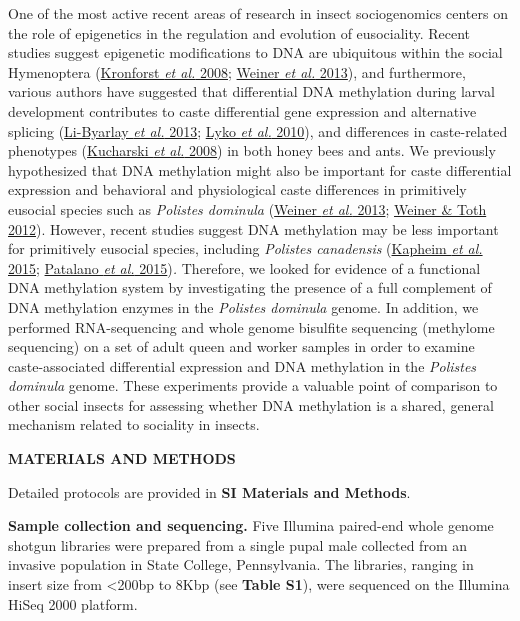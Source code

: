 \documentclass[]{article}
\begin{document}
One of the most active recent areas of research in insect sociogenomics
centers on the role of epigenetics in the regulation and evolution of
eusociality. Recent studies suggest epigenetic modifications to DNA are
ubiquitous within the social Hymenoptera
(\protect\hyperlink{ux5fENREFux5f26}{Kronforst \emph{et al.} 2008};
\protect\hyperlink{ux5fENREFux5f67}{Weiner \emph{et al.} 2013}), and
furthermore, various authors have suggested that differential DNA
methylation during larval development contributes to caste differential
gene expression and alternative splicing
(\protect\hyperlink{ux5fENREFux5f32}{Li-Byarlay \emph{et al.} 2013};
\protect\hyperlink{ux5fENREFux5f33}{Lyko \emph{et al.} 2010}), and
differences in caste-related phenotypes
(\protect\hyperlink{ux5fENREFux5f28}{Kucharski \emph{et al.} 2008}) in
both honey bees and ants. We previously hypothesized that DNA
methylation might also be important for caste differential expression
and behavioral and physiological caste differences in primitively
eusocial species such as \emph{Polistes dominula}
(\protect\hyperlink{ux5fENREFux5f67}{Weiner \emph{et al.} 2013};
\protect\hyperlink{ux5fENREFux5f68}{Weiner \& Toth 2012}). However,
recent studies suggest DNA methylation may be less important for
primitively eusocial species, including \emph{Polistes canadensis}
(\protect\hyperlink{ux5fENREFux5f24}{Kapheim \emph{et al.} 2015};
\protect\hyperlink{ux5fENREFux5f43}{Patalano \emph{et al.}
2015})\emph{.} Therefore, we looked for evidence of a functional DNA
methylation system by investigating the presence of a full complement of
DNA methylation enzymes in the \emph{Polistes dominula} genome. In
addition, we performed RNA-sequencing and whole genome bisulfite
sequencing (methylome sequencing) on a set of adult queen and worker
samples in order to examine caste-associated differential expression and
DNA methylation in the \emph{Polistes dominula} genome. These
experiments provide a valuable point of comparison to other social
insects for assessing whether DNA methylation is a shared, general
mechanism related to sociality in insects.

\textbf{MATERIALS AND METHODS}

Detailed protocols are provided in \textbf{SI Materials and Methods}.

\textbf{Sample collection and sequencing.} Five Illumina paired-end
whole genome shotgun libraries were prepared from a single pupal male
collected from an invasive population in State College, Pennsylvania.
The libraries, ranging in insert size from \textless{}200bp to 8Kbp (see
\textbf{Table S1}), were sequenced on the Illumina HiSeq 2000 platform.
\end{document}
